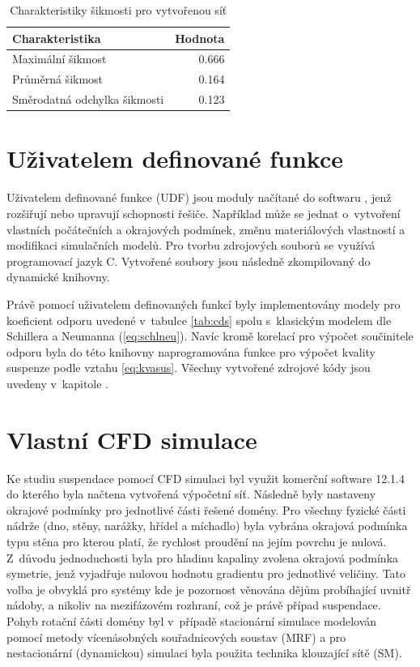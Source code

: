 \begin{table}[h!]
\centering
\caption{Charakteristiky šikmosti pro vytvořenou síť}
\label{tab:skw_tab}
\begin{tabular}{lr}
\toprule
\textbf{Charakteristika} & \textbf{Hodnota} \\
\midrule

Maximální šikmost & \num{0.666} \\
Průměrná šikmost & \num{0.164} \\
Směrodatná odchylka šikmosti & \num{0.123} \\

\bottomrule
\end{tabular}
\end{table}

\section{Uživatelem definované funkce}
Uživatelem definované funkce (UDF) jsou moduly načítané do softwaru \flu, jenž rozšiřují nebo upravují schopnosti řešiče. Například může se jednat o~vytvoření vlastních počátečních a okrajových podmínek, změnu materiálových vlastností a modifikaci simulačních modelů. Pro tvorbu zdrojových souborů se využívá programovací jazyk C. Vytvořené soubory jsou následně zkompilovaný do dynamické knihovny.

Právě pomocí uživatelem definovaných funkcí byly implementovány modely pro koeficient odporu uvedené v~tabulce \ref{tab:cds} spolu s~klasickým modelem dle Schillera a Neumanna (\ref{eq:schlneu}). Navíc kromě korelací pro výpočet součinitele odporu byla do této knihovny naprogramována funkce pro výpočet kvality suspenze podle vztahu \ref{eq:kvasus}. Všechny vytvořené zdrojové kódy jsou uvedeny v~kapitole .

\section{Vlastní CFD simulace}
Ke studiu suspendace pomocí CFD simulaci byl využit komerční software \flu{} 12.1.4 do kterého byla načtena vytvořená výpočetní síť. Následně byly nastaveny okrajové podmínky pro jednotlivé části řešené domény. Pro všechny fyzické části nádrže (dno, stěny, narážky, hřídel a míchadlo) byla vybrána okrajová podmínka typu stěna pro kterou platí, že rychlost proudění na jejím povrchu je nulová. Z~důvodu jednoduchosti byla pro hladinu kapaliny zvolena okrajová podmínka symetrie, jenž vyjadřuje nulovou hodnotu gradientu pro jednotlivé veličiny. Tato volba je obvyklá pro systémy kde je pozornost věnována dějům probíhající uvnitř nádoby, a nikoliv na mezifázovém rozhraní, což je právě případ suspendace. Pohyb rotační části domény byl v~případě stacionární simulace modelován pomocí metody vícenásobných souřadnicových soustav (MRF) a pro nestacionární (dynamickou) simulaci byla použita technika klouzající sítě (SM). 

